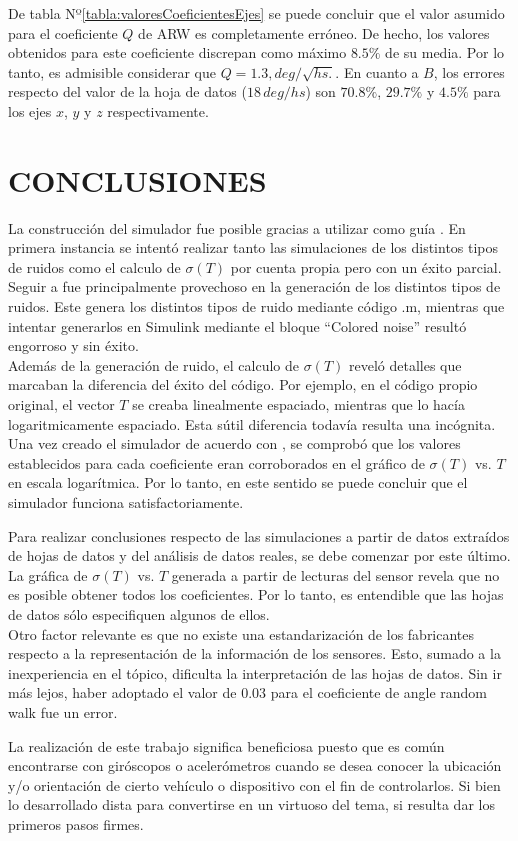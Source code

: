 \documentclass[a4paper,11pt,twoside]{IT-CNEA}
\begin{document}
De tabla Nº\ref{tabla:valoresCoeficientesEjes} se puede concluir que el valor asumido para el coeficiente $Q$ de ARW es completamente erróneo. De hecho, los valores obtenidos para este coeficiente discrepan como máximo $8.5\%$ de su media. Por lo tanto, es admisible considerar que $Q=1.3,deg/\sqrt{hs.}$. En cuanto a $B$, los errores respecto del valor de la hoja de datos ($18\,deg/hs$) son $70.8\%$, $29.7\%$ y $4.5\%$ para los ejes $x$, $y$ y $z$ respectivamente.  
\clearpage
\newpage
\section{CONCLUSIONES}
La construcción del simulador fue posible gracias a utilizar como guía \cite{JuanJurado}. En primera instancia se intentó realizar tanto las simulaciones de los distintos tipos de ruidos como el calculo de $\sigma(T)$ por cuenta propia pero con un éxito parcial. Seguir a \cite{JuanJurado} fue principalmente provechoso en la generación de los distintos tipos de ruidos. Este genera los distintos tipos de ruido mediante código .m, mientras que intentar generarlos en Simulink mediante el bloque ``Colored noise'' resultó engorroso y sin éxito. 
\\ Además de la generación de ruido, el calculo de $\sigma(T)$ reveló detalles que marcaban la diferencia del éxito del código. Por ejemplo, en el código propio original, el vector $T$ se creaba linealmente espaciado, mientras que \cite{JuanJurado} lo hacía logaritmicamente espaciado. Esta sútil diferencia todavía resulta una incógnita. 
\\ Una vez creado el simulador de acuerdo con \cite{JuanJurado}, se comprobó que los valores establecidos para cada coeficiente eran corroborados en el gráfico de $\sigma(T)$ vs. $T$ en escala logarítmica. Por lo tanto, en este sentido se puede concluir que el simulador funciona satisfactoriamente. 
\par Para realizar conclusiones respecto de las simulaciones a partir de datos extraídos de hojas de datos y del análisis de datos reales, se debe comenzar por este último. La gráfica de $\sigma(T)$ vs. $T$ generada a partir de lecturas del sensor revela que no es posible obtener todos los coeficientes. Por lo tanto, es entendible que las hojas de datos sólo especifiquen algunos de ellos. 
\\ Otro factor relevante es que no existe una estandarización de los fabricantes respecto a la representación de la información de los sensores. Esto, sumado a la inexperiencia en el tópico, dificulta la interpretación de las hojas de datos. Sin ir más lejos, haber adoptado el valor de $0.03$ para el coeficiente de angle random walk fue un error. 
\par La realización de este trabajo significa beneficiosa puesto que es común encontrarse con giróscopos o acelerómetros cuando se desea conocer la ubicación y/o orientación de cierto vehículo o dispositivo con el fin de controlarlos. Si bien lo desarrollado dista para convertirse en un virtuoso del tema, si resulta dar los primeros pasos firmes. 
\clearpage
\newpage


\end{document}
